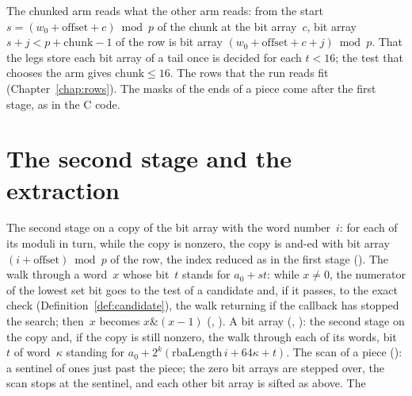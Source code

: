 The chunked arm reads what the other arm reads: from the start $s = (w_0 + \mathrm{offset} + c)
\bmod p$ of the chunk at the bit array~$c$, bit array $s + j < p + \mathrm{chunk} - 1$ of the row
is bit array $(w_0 + \mathrm{offset} + c + j) \bmod p$. That the legs store each bit array of a
tail once is decided for each $t < 16$; the test that chooses the arm gives $\mathrm{chunk} \le
16$. The rows that the run reads fit (Chapter~\ref{chap:rows}). The masks of the ends of a piece
come after the first stage, as in the C code.

\section{The second stage and the extraction}\label{sec:extraction}

\begin{definition}\label{def:extraction}
  \leanok
  The second stage on a copy of the bit array with the word number~$i$: for each of its moduli in
  turn, while the copy is nonzero, the copy is and-ed with bit array $(i + \mathrm{offset}) \bmod p$
  of the row, the index reduced as in the first stage (). The walk
  through a word~$x$ whose bit~$t$ stands for $a_0 + s t$: while $x \ne 0$, the numerator of the
  lowest set bit goes to the test of a candidate and, if it passes, to the exact check
  (Definition~\ref{def:candidate}), the walk returning if the callback has stopped the search;
  then~$x$ becomes $x \mathbin{\&} (x - 1)$ (,
  ). A bit array (,
  ): the second stage on the copy and, if the copy is still nonzero,
  the walk through each of its words, bit~$t$ of word~$\kappa$ standing for
  $a_0 + 2^k(\mathrm{rbaLength}\, i + 64\kappa + t)$. The scan of a piece
  (): a sentinel of ones just past the piece; the zero bit arrays are
  stepped over, the scan stops at the sentinel, and each other bit array is sifted as above. The

\end{definition}
